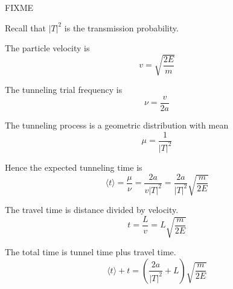 


\bigskip
FIXME

\bigskip
Recall that $|T|^2$ is the transmission probability.

\bigskip
The particle velocity is
\begin{equation*}
v=\sqrt{\frac{2E}{m}}
\end{equation*}

The tunneling trial frequency is
\begin{equation*}
\nu=\frac{v}{2a}
\end{equation*}

The tunneling process is a geometric distribution with mean
\begin{equation*}
\mu=\frac{1}{|T|^2}
\end{equation*}

Hence the expected tunneling time is
\begin{equation*}
\langle t\rangle=\frac{\mu}{\nu}
=\frac{2a}{v|T|^2}
=\frac{2a}{|T|^2}\sqrt{\frac{m}{2E}}
\end{equation*}

The travel time is distance divided by velocity.
\begin{equation*}
t=\frac{L}{v}=L\sqrt{\frac{m}{2E}}
\end{equation*}

The total time is tunnel time plus travel time.
\begin{equation*}
\langle t\rangle+t
=\left(\frac{2a}{|T|^2}+L\right)\sqrt{\frac{m}{2E}}
\end{equation*}


